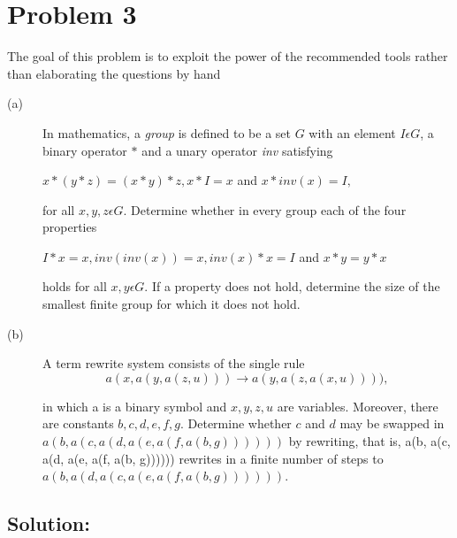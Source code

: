 \section*{Problem 3}

The goal of this problem is to exploit the power of the recommended tools rather than elaborating the questions by hand

\begin{description}
  \item[(a)] In mathematics, a \emph{group} is defined to be a set $G$ with an element $I \epsilon G$, a binary operator $\ast$ and a unary operator \emph{inv} satisfying
      \begin{center}
      $ x \ast(y \ast z)=(x\ast y) \ast z, x \ast I = x $ and $ x \ast inv(x) = I, $
      \end{center}
      for all $x, y, z \epsilon G$. Determine whether in every group each of the four properties
      \begin{center}
      $I \ast x = x, inv(inv(x)) = x, inv(x) \ast x = I $ and $ x \ast y = y \ast x $
      \end{center}
      holds for all $x, y \epsilon G$. If a property does not hold, determine the size of the smallest finite group for which it does not hold.
  \item[(b)] A term rewrite system consists of the single rule
  \[ a(x, a(y, a(z, u))) \rightarrow a(y, a(z, a(x, u)))), \]

  in which a is a binary symbol and $x, y, z, u$ are variables. Moreover, there are constants $b, c, d, e, f, g$. Determine whether $c$ and $d$ may be swapped in $a(b, a(c, a(d, a(e, a(f, a(b, g))))))$ by rewriting, that is, a(b, a(c, a(d, a(e, a(f, a(b, g)))))) rewrites in a finite number of steps to $a(b, a(d, a(c, a(e, a(f, a(b, g))))))$.

\end{description}

\vspace{4mm}

\subsection*{Solution:}

